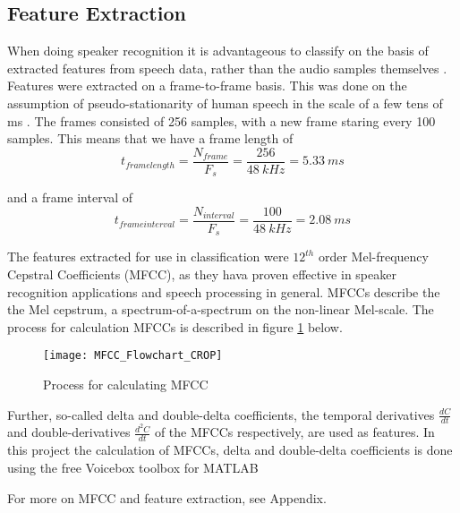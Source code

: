 \subsection*{Feature Extraction}
When doing speaker recognition it is advantageous to classify on the basis of extracted features from speech data, rather than the audio samples themselves \cite{Springer:36}.
Features were extracted on a frame-to-frame basis.
This was done on the assumption of pseudo-stationarity of human speech in the scale of a few tens of ms \cite{Springer:36}.
The frames consisted of 256 samples, with a new frame staring every 100 samples.
This means that we have a frame length of
\begin{equation}
t_{frame length} = \dfrac{N_{frame}}{F_s} = \dfrac{256}{48\ kHz} = 5.33\ ms
\end{equation}

and a frame interval of
\begin{equation}
t_{frame interval} = \dfrac{N_{interval}}{F_s} = \dfrac{100}{48\ kHz} = 2.08\ ms
\end{equation}

The features extracted for use in classification were $12^{th}$ order Mel-frequency Cepstral Coefficients (MFCC), as they hava proven effective in speaker recognition applications and speech processing in general.
MFCCs describe the the Mel cepstrum, a spectrum-of-a-spectrum on the non-linear Mel-scale.
The process for calculation MFCCs is described in figure \ref{fig:MFCC_Flowchart} below.

\begin{figure}[H]
\centering
\texttt{[image: MFCC\_Flowchart\_CROP]}
\caption{Process for calculating MFCC}
\label{fig:MFCC_Flowchart}
\end{figure}

Further, so-called delta and double-delta coefficients, the temporal derivatives $ \frac{dC}{dt} $ and double-derivatives $\frac{d^2C}{dt}$ of the MFCCs respectively, are used as features.
In this project the calculation of MFCCs, delta and double-delta coefficients is done using the free Voicebox toolbox for MATLAB \cite{voicebox}

For more on MFCC and feature extraction, see Appendix.
